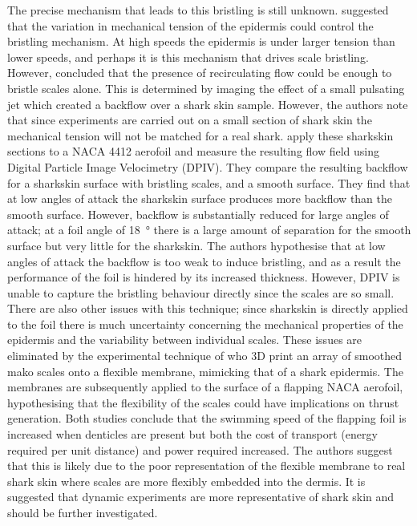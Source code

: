 \documentclass[12pt,oneside,a4paper]{article}
\begin{document}
The precise mechanism that leads to this bristling is still unknown. \cite{bechert1985} suggested that the variation in mechanical tension of the epidermis could control the bristling mechanism. At high speeds the epidermis is under larger tension than lower speeds, and perhaps it is this mechanism that drives scale bristling. However, \cite{lang2014} concluded that the presence of recirculating flow could be enough to bristle scales alone. This is determined by imaging the effect of a small pulsating jet which created a backflow over a shark skin sample. However, the authors note that since experiments are carried out on a small section of shark skin the mechanical tension will not be matched for a real shark. \cite{lang2014} apply these sharkskin sections to a NACA 4412 aerofoil and measure the resulting flow field using Digital Particle Image Velocimetry (DPIV). They compare the resulting backflow for a sharkskin surface with bristling scales, and a smooth surface. They find that at low angles of attack the sharkskin surface produces more backflow than the smooth surface. However, backflow is substantially reduced for large angles of attack; at a foil angle of \SI{18}{\degree} there is a large amount of separation for the smooth surface but very little for the sharkskin. The authors hypothesise that at low angles of attack the backflow is too weak to induce bristling, and as a result the performance of the foil is hindered by its increased thickness. However, DPIV is unable to capture the bristling behaviour directly since the scales are so small. There are also other issues with this technique; since sharkskin is directly applied to the foil there is much uncertainty concerning the mechanical properties of the epidermis and the variability between individual scales. These issues are eliminated by the experimental technique of \cite{wen2014,wen2015} who 3D print an array of smoothed mako scales onto a flexible membrane, mimicking that of a shark epidermis. The membranes are subsequently applied to the surface of a flapping NACA aerofoil, hypothesising that the flexibility of the scales could have implications on thrust generation. Both studies conclude that the swimming speed of the flapping foil is increased when denticles are present but both the cost of transport (energy required per unit distance) and power required increased. The authors suggest that this is likely due to the poor representation of the flexible membrane to real shark skin where scales are more flexibly embedded into the dermis. It is suggested that dynamic experiments are more representative of shark skin and should be further investigated.
\end{document}
